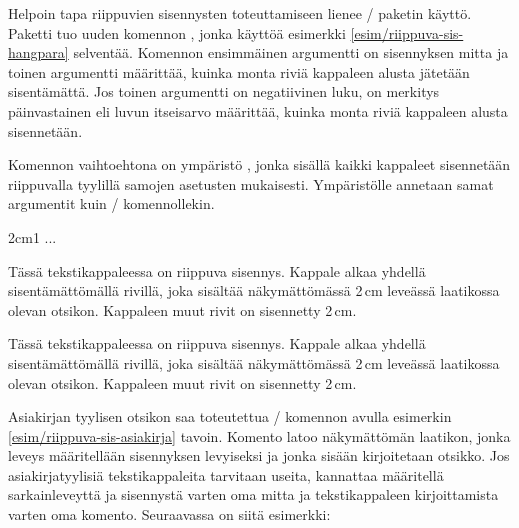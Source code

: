 Helpoin tapa riippuvien sisennysten toteuttamiseen lienee
\-/ paketin käyttö. Paketti tuo uuden komennon
, jonka käyttöä esimerkki
\ref{esim/riippuva-sis-hangpara} selventää. Komennon ensimmäinen
argumentti on sisennyksen mitta ja toinen argumentti määrittää, kuinka
monta riviä kappaleen alusta jätetään sisentämättä. Jos toinen
argumentti on negatiivinen luku, on merkitys päinvastainen eli luvun
itseisarvo määrittää, kuinka monta riviä kappaleen alusta sisennetään.

Komennon  vaihtoehtona on ympäristö
, jonka sisällä kaikki kappaleet sisennetään
riippuvalla tyylillä samojen asetusten mukaisesti. Ympäristölle annetaan
samat argumentit kuin \-/ komennollekin.

\begin{koodilohkosis}
\begin{hangparas}{2cm}{1}
  ...
\end{hangparas}
\end{koodilohkosis}

\begin{esimerkki*}
  \komentoi{,}

\begin{koodilohko}
Tässä tekstikappaleessa on
riippuva sisennys. Kappale alkaa yhdellä sisentämättömällä rivillä,
joka sisältää näkymättömässä 2\,cm leveässä laatikossa olevan otsikon.
Kappaleen muut rivit on sisennetty 2\,cm.
\end{koodilohko}
  \begin{tulos}
    Tässä tekstikappaleessa on
    riippuva sisennys. Kappale alkaa yhdellä sisentämättömällä rivillä,
    joka sisältää näkymättömässä 2\,cm leveässä laatikossa olevan otsikon.
    Kappaleen muut rivit on sisennetty 2\,cm.
  \end{tulos}
  \caption{Asiakirjan tyylisten tekstikappaleiden toteutus}
  \label{esim/riippuva-sis-asiakirja}
\end{esimerkki*}

\noindent
Asiakirjan tyylisen otsikon saa toteutettua \-/
komennon avulla esimerkin \ref{esim/riippuva-sis-asiakirja} tavoin.
Komento latoo näkymättömän laatikon, jonka leveys määritellään
sisennyksen levyiseksi ja jonka sisään kirjoitetaan otsikko. Jos
asiakirjatyylisiä tekstikappaleita tarvitaan useita, kannattaa
määritellä sarkainleveyttä ja sisennystä varten oma mitta ja
tekstikappaleen kirjoittamista varten oma komento. Seuraavassa on siitä
esimerkki:

